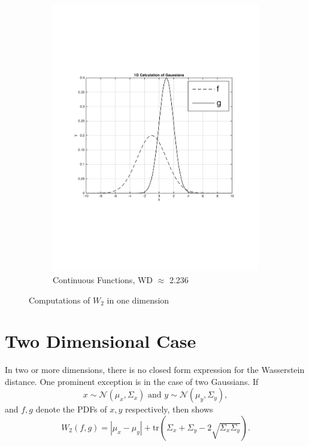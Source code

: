 \documentclass[10pt]{article}
\begin{document}
\begin{figure}[H]
\begin{subfigure}{.5\textwidth}
  \includegraphics[scale = .5]{2nd1DWD.pdf}
  \caption{Continuous Functions, WD $\approx$ 2.236}
  \label{fig: 1DContinuous}
\end{subfigure}
\caption{Computations of $W_2$ in one dimension}
\label{fig:1DWDCalculations}
\end{figure}

\section{Two Dimensional Case}
\label{sec: TwoD}

In two or more dimensions, there is no closed form expression for the Wasserstein distance. One prominent exception is in the case of two Gaussians. If 
\begin{equation}
x \sim \mathcal{N}(\mu_x, \Sigma_x) \text{   and   } y \sim \mathcal{N}(\mu_y, \Sigma_y), 
\end{equation}
and $f, g$ denote the PDFs of $x, y$ respectively, then \cite{Downson}  shows 
\begin{equation}
W_2(f, g) = |\mu_x - \mu_y| +\text{tr}(\Sigma_x + \Sigma_y - 2\sqrt{\Sigma_x\Sigma_y}).
\end{equation}
\end{document}
